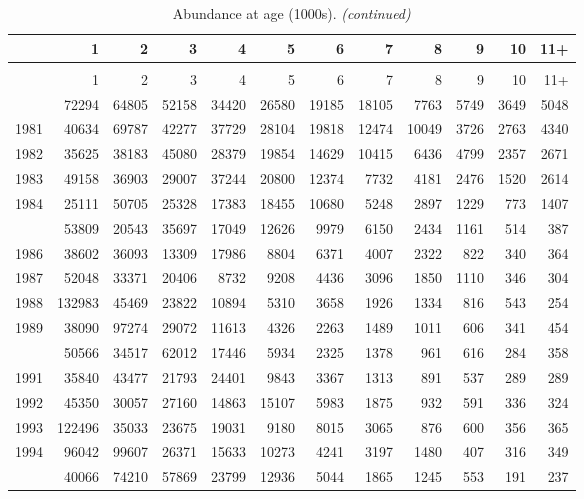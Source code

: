 \documentclass[
]{article}
\begin{document}
\begin{longtable}[t]{lrrrrrrrrrrr}
\caption{\label{tab:NAA-table}Abundance at age (1000s).}\\
\toprule
  & 1 & 2 & 3 & 4 & 5 & 6 & 7 & 8 & 9 & 10 & 11+\\
\midrule
\endfirsthead
\caption[]{Abundance at age (1000s). \textit{(continued)}}\\
\toprule
  & 1 & 2 & 3 & 4 & 5 & 6 & 7 & 8 & 9 & 10 & 11+\\
\midrule
\endhead

\endfoot
\bottomrule
\endlastfoot
1980 & 72294 & 64805 & 52158 & 34420 & 26580 & 19185 & 18105 & 7763 & 5749 & 3649 & 5048\\
1981 & 40634 & 69787 & 42277 & 37729 & 28104 & 19818 & 12474 & 10049 & 3726 & 2763 & 4340\\
1982 & 35625 & 38183 & 45080 & 28379 & 19854 & 14629 & 10415 & 6436 & 4799 & 2357 & 2671\\
1983 & 49158 & 36903 & 29007 & 37244 & 20800 & 12374 & 7732 & 4181 & 2476 & 1520 & 2614\\
1984 & 25111 & 50705 & 25328 & 17383 & 18455 & 10680 & 5248 & 2897 & 1229 & 773 & 1407\\
\addlinespace
1985 & 53809 & 20543 & 35697 & 17049 & 12626 & 9979 & 6150 & 2434 & 1161 & 514 & 387\\
1986 & 38602 & 36093 & 13309 & 17986 & 8804 & 6371 & 4007 & 2322 & 822 & 340 & 364\\
1987 & 52048 & 33371 & 20406 & 8732 & 9208 & 4436 & 3096 & 1850 & 1110 & 346 & 304\\
1988 & 132983 & 45469 & 23822 & 10894 & 5310 & 3658 & 1926 & 1334 & 816 & 543 & 254\\
1989 & 38090 & 97274 & 29072 & 11613 & 4326 & 2263 & 1489 & 1011 & 606 & 341 & 454\\
\addlinespace
1990 & 50566 & 34517 & 62012 & 17446 & 5934 & 2325 & 1378 & 961 & 616 & 284 & 358\\
1991 & 35840 & 43477 & 21793 & 24401 & 9843 & 3367 & 1313 & 891 & 537 & 289 & 289\\
1992 & 45350 & 30057 & 27160 & 14863 & 15107 & 5983 & 1875 & 932 & 591 & 336 & 324\\
1993 & 122496 & 35033 & 23675 & 19031 & 9180 & 8015 & 3065 & 876 & 600 & 356 & 365\\
1994 & 96042 & 99607 & 26371 & 15633 & 10273 & 4241 & 3197 & 1480 & 407 & 316 & 349\\
\addlinespace
1995 & 40066 & 74210 & 57869 & 23799 & 12936 & 5044 & 1865 & 1245 & 553 & 191 & 237\\

\end{longtable}
\end{document}
